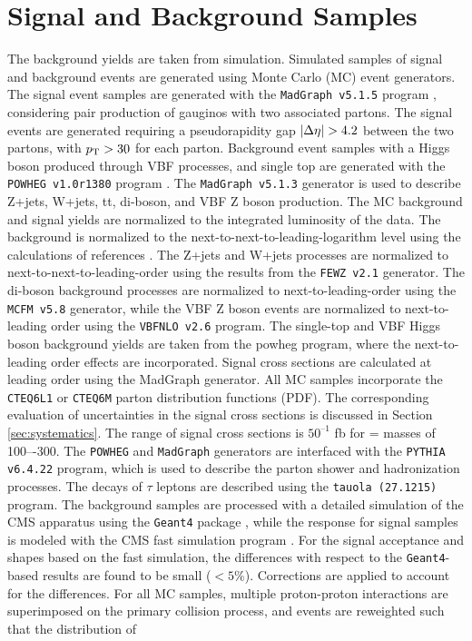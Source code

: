 \clearpage

\section{Signal and Background Samples}

The background yields are taken from simulation. Simulated samples of signal and background events are generated using Monte Carlo (MC) event generators. The signal event samples are generated with the \texttt{MadGraph v5.1.5} program \cite{Alwall:2011uj}, considering pair production of gauginos with two associated partons. The signal events are generated requiring a pseudorapidity gap $|\Delta\eta| > 4.2$ between the two partons, with $p_{\text{T}} > 30$ \pt for each parton. Background event samples with a Higgs boson produced through VBF processes, and single top are generated with the \texttt{POWHEG v1.0r1380} program \cite{Frixione:2007vw}. The \texttt{MadGraph v5.1.3} generator is used to describe Z+jets, W+jets, tt, di-boson, and VBF Z boson production. The MC background and signal yields are normalized to the integrated luminosity of the data. The \ttbar background is normalized to the next-to-next-to-leading-logarithm level using the calculations of references \cite{Czakon:2013goa,Melnikov:2006kv}. The Z+jets and W+jets processes are normalized to next-to-next-to-leading-order using the results from the \texttt{FEWZ v2.1} \cite{Gavin:2010az} generator. The di-boson background processes are normalized to next-to-leading-order using the \texttt{MCFM v5.8} \cite{Campbell:2010ff} generator, while the VBF Z boson events are normalized to next-to-leading order using the \texttt{VBFNLO v2.6} \cite{Arnold:2008rz,Arnold:2011wj}program. The single-top and VBF Higgs boson background yields are taken from the powheg program, where the next-to-leading order effects are incorporated. Signal cross sections are calculated at leading order using the MadGraph generator. All MC samples incorporate the \texttt{CTEQ6L1} \cite{Pumplin:2002vw} or \texttt{CTEQ6M} \cite{Nadolsky:2008zw} parton distribution functions (PDF). The corresponding evaluation of uncertainties in the signal cross sections is discussed in Section \ref{sec:systematics}. The range of signal cross sections is $50^{–1}$ fb for \charginopm = \neutralinotwo masses of 100–-300\gev. The \texttt{POWHEG} and \texttt{MadGraph} generators are interfaced with the \texttt{PYTHIA v6.4.22} \cite{Sjostrand:2006za} program, which is used to describe the parton shower and hadronization processes. The decays of $\tau$ leptons are described using the \texttt{tauola (27.1215)} \cite{Davidson:2010rw} program. The background samples are processed with a detailed simulation of the CMS apparatus using the \texttt{Geant4} package \cite{Agostinelli:2002hh}, while the response for signal samples is modeled with the CMS fast simulation program \cite{Abdullin:2011zz}. For the signal acceptance and \mjj shapes based on the fast simulation, the differences with respect to the \texttt{Geant4}-based results are found to be small ($< 5\%$). Corrections are applied to account for the differences. For all MC samples, multiple proton-proton interactions are superimposed on the primary collision process, and events are reweighted such that the distribution of 